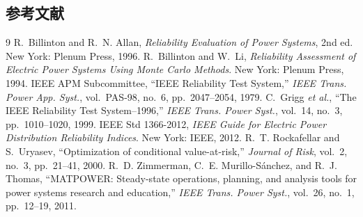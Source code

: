 \subsection{参考文献}
\begin{thebibliography}{9}\small
{} R.~Billinton and R.~N. Allan, \emph{Reliability Evaluation of Power
  Systems}, 2nd ed. New York: Plenum Press, 1996.
 R.~Billinton and W.~Li, \emph{Reliability Assessment of Electric Power
  Systems Using Monte Carlo Methods}. New York: Plenum Press, 1994.
 IEEE APM Subcommittee, ``IEEE Reliability Test System,'' \emph{IEEE Trans. Power
  App. Syst.}, vol.~PAS-98, no.~6, pp.~2047--2054, 1979.
 C.~Grigg \emph{et al.}, ``The IEEE Reliability Test System--1996,'' \emph{IEEE
  Trans. Power Syst.}, vol.~14, no.~3, pp.~1010--1020, 1999.
 IEEE Std 1366-2012, \emph{IEEE Guide for Electric Power Distribution
  Reliability Indices}. New York: IEEE, 2012.
 R.~T. Rockafellar and S.~Uryasev, ``Optimization of conditional
  value-at-risk,'' \emph{Journal of Risk}, vol.~2, no.~3, pp.~21--41, 2000.
 R.~D. Zimmerman, C.~E. Murillo-S\'anchez, and R.~J. Thomas,
  ``MATPOWER: Steady-state operations, planning, and analysis tools for power systems
  research and education,'' \emph{IEEE Trans. Power Syst.}, vol.~26, no.~1, pp.~12--19, 2011.
\end{thebibliography}
